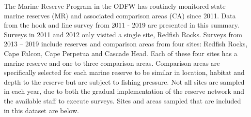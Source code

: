 \documentclass[11pt,
  english,
  a4paper,
]{article}
\begin{document}
\leavevmode\tagmcend\tagstructend\par


The Marine Reserve Program in the ODFW has routinely monitored state marine reserves (MR) and associated comparison areas (CA) since 2011. Data from the hook and line survey from 2011 - 2019 are presented in this summary. Surveys in 2011 and 2012 only visited a single site, Redfish Rocks. Surveys from 2013 -- 2019 include reserves and comparison areas from four sites: Redfish Rocks, Cape Falcon, Cape Perpetua and Cascade Head. Each of these four sites has a marine reserve and one to three comparison areas. Comparison areas are specifically selected for each marine reserve to be similar in location, habitat and depth to the reserve but are subject to fishing pressure. Not all sites are sampled in each year, due to both the gradual implementation of the reserve network and the available staff to execute surveys. Sites and areas sampled that are included in this dataset are below.

\leavevmode\tagmcend\tagstructend\par

\begingroup\fontsize{10}{12}\selectfont
\begingroup\fontsize{10}{12}\selectfont
\end{document}
